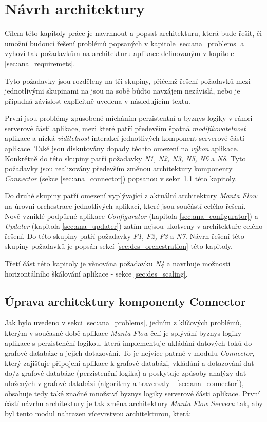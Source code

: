 \chapter{Návrh architektury}
Cílem této kapitoly práce je navrhnout a popsat architekturu, která bude řešit, či umožní budoucí řešení problémů popsaných v kapitole \ref{sec:ana_problems} a vyhoví tak požadavkům na architekturu aplikace definovaným v kapitole \ref{sec:ana_requiremets}.

Tyto požadavky jsou rozděleny na tři skupiny, přičemž řešení požadavků mezi jednotlivými skupinami na jsou na sobě bůďto navzájem nezávislá, nebo je případná závislost explicitně uvedena v následujícím textu.

První jsou problémy způsobené mícháním perzistentní a byznys logiky v rámci serverové části aplikace, mezi které patří především špatná \textit{modifikovatelnost} aplikace a nízká \textit{viditelnost} interakcí jednotlivých komponent serverové částí aplikace. Také jsou diskutovány dopady těchto omezení na \textit{výkon} aplikace. Konkrétně do této skupiny patří požadavky \textit{N1, N2, N3, N5, N6} a \textit{N8}. Tyto požadavky jsou realizovány především změnou architektury komponenty \textit{Connector} (sekce \ref{sec:ana_connector}) popsanou v sekci \ref{sec:des_api} této kapitoly.

Do druhé skupiny patří omezení vyplývající z aktuální architektury \textit{Manta Flow} na úrovni orchestrace jednotlivých aplikací, které jsou součástí celého řešení. Nově vzniklé podpůrné aplikace \textit{Configurator} (kapitola \ref{sec:ana_configurator}) a \textit{Updater} (kapitola \ref{sec:ana_updater}) zatím nejsou ukotveny v architektuře celého řešení.
Do této skupiny patří požadavky \textit{F1, F2, F3} a \textit{N7}. Návrh řešení této skupiny požadavků je popsán sekcí \ref{sec:des_orchestration} této kapitoly.

Třetí část této kapitoly je věnována požadavku \textit{N4} a navrhuje možnosti horizontálního škálování aplikace - sekce \ref{sec:des_scaling}.

\section{Úprava architektury komponenty Connector}
\label{sec:des_api}
Jak bylo uvedeno v sekci \ref{sec:ana_problems}, jedním z klíčových problémů, kterým v současné době aplikace \textit{Manta Flow} čelí je splývání byznys logiky aplikace s perzistenční logikou, která implementuje ukládání datových toků do grafové databáze a jejich dotazování. To je nejvíce patrné v modulu \textit{Connector}, který zajišťuje připojení aplikace k grafové databázi, vkládání a dotazování dat do/z grafové databáze (perzistenční logika) a poskytuje způsoby analýzy dat uložených v grafové databázi (algoritmy a traversaly - \ref{sec:ana_connector}), obsahuje tedy také značné množství byznys logiky serverové části aplikace. První částí návrhu architektury je tak změna architektury \textit{Manta Flow Serveru} tak, aby byl tento modul nahrazen vícevrstvou architekturou, která:

